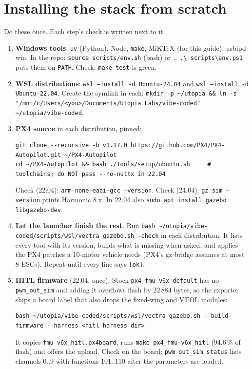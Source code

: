 \documentclass[11pt,a4paper]{article}
\newcommand{\file}[1]{\texttt{#1}}
\begin{document}
\section{Installing the stack from scratch}

Do these once. Each step's check is written next to it.

\begin{enumerate}[leftmargin=*]
  \item \textbf{Windows tools}: \file{uv} (Python), Node, \file{make}, MiKTeX (for this guide),
        usbipd-win. In the repo: \file{source scripts/env.sh} (bash) or \file{. .\textbackslash
        scripts\textbackslash env.ps1} puts them on \file{PATH}. Check: \file{make test} is green.
  \item \textbf{WSL distributions}: \file{wsl --install -d Ubuntu-24.04} and
        \file{wsl --install -d Ubuntu-22.04}. Create the symlink in each:
        \file{mkdir -p \textasciitilde/utopia \&\& ln -s "/mnt/c/Users/<you>/Documents/Utopia Labs/vibe-coded" \textasciitilde/utopia/vibe-coded}.
  \item \textbf{PX4 source} in each distribution, pinned:
\begin{lstlisting}
git clone --recursive -b v1.17.0 https://github.com/PX4/PX4-Autopilot.git ~/PX4-Autopilot
cd ~/PX4-Autopilot && bash ./Tools/setup/ubuntu.sh     # toolchains; do NOT pass --no-nuttx in 22.04
\end{lstlisting}
        Check (22.04): \file{arm-none-eabi-gcc --version}. Check (24.04): \file{gz sim --version}
        prints Harmonic 8.x. In 22.04 also \file{sudo apt install gazebo libgazebo-dev}.
  \item \textbf{Let the launcher finish the rest}. Run
        \file{bash \textasciitilde/utopia/vibe-coded/scripts/wsl/vectra\_gazebo.sh --check}
        in each distribution. It lists every tool with its version, builds what is missing when
        asked, and applies the PX4 patches a 10-motor vehicle needs (PX4's gz bridge assumes at
        most 8 ESCs). Repeat until every line says \texttt{[ok]}.
  \item \textbf{HITL firmware} (22.04, once). Stock \file{px4\_fmu-v6x\_default} has no
        \file{pwm\_out\_sim} and adding it overflows flash by 22\,884 bytes, so the exporter ships
        a board label that also drops the fixed-wing and VTOL modules:
\begin{lstlisting}
bash ~/utopia/vibe-coded/scripts/wsl/vectra_gazebo.sh --build-firmware --harness <hitl harness dir>
\end{lstlisting}
        It copies \file{fmu-v6x\_hitl.px4board}, runs \file{make px4\_fmu-v6x\_hitl} (94.6\,\% of
        flash) and offers the upload. Check on the board: \file{pwm\_out\_sim status} lists
        channels 0..9 with functions 101..110 after the parameters are loaded.
\end{enumerate}
\end{document}
